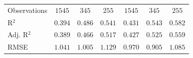 \begin{center}
\begin{small}
\begin{longtable}{l@{} c@{} c@{} c@{} c@{} c@{} c@{}}
\hline
Observations                        & $1545$           & $345$         & $255$         & $1545$          & $345$          & $255$          \\
R$^2$                               & $0.394$          & $0.486$       & $0.541$       & $0.431$         & $0.543$        & $0.582$        \\
Adj. R$^2$                          & $0.389$          & $0.466$       & $0.517$       & $0.427$         & $0.525$        & $0.559$        \\
RMSE                                & $1.041$          & $1.005$       & $1.129$       & $0.970$         & $0.905$        & $1.085$        \\
\end{longtable}
\end{small}
\end{center}
